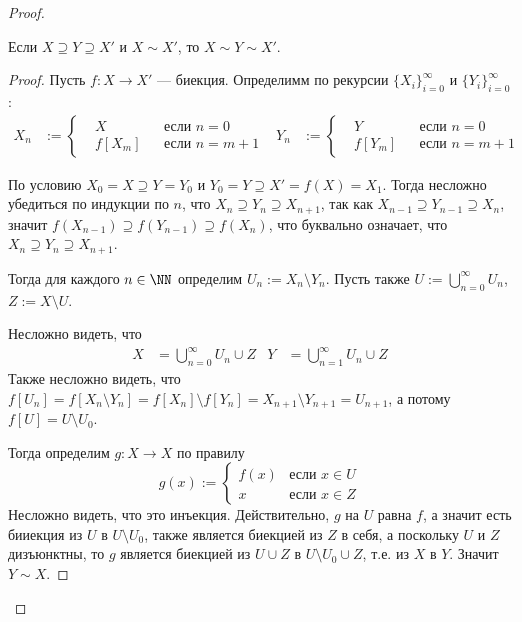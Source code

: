 \documentclass[12pt,a4paper]{article}
\begin{document}
    \begin{proof}
        \begin{thlemma}\label{CSB-th-lemma}
            Если $X \supseteq Y \supseteq X'$ и $X \sim X'$, то $X \sim Y \sim X'$.
        \end{thlemma}

        \begin{proof}
            Пусть $f: X \to X'$ --- биекция. Определимм по рекурсии $\{X_i\}_{i=0}^\infty$ и $\{Y_i\}_{i=0}^\infty$:
            \begin{align*}
                X_n &:= \left\{\begin{aligned}
                    &X && \text{если $n = 0$}\\
                    &f[X_m] && \text{если $n=m+1$}
                \end{aligned}\right.&
                Y_n &:= \left\{\begin{aligned}
                    &Y && \text{если $n = 0$}\\
                    &f[Y_m] && \text{если $n=m+1$}
                \end{aligned}\right.
            \end{align*}

            По условию $X_0 = X \supseteq Y = Y_0$ и $Y_0 = Y \supseteq X' = f(X) = X_1$. Тогда несложно убедиться по индукции по $n$, что $X_n \supseteq Y_n \supseteq X_{n+1}$, так как $X_{n-1} \supseteq Y_{n-1} \supseteq X_n$, значит $f(X_{n-1}) \supseteq f(Y_{n-1}) \supseteq f(X_n)$, что буквально означает, что $X_n \supseteq Y_n \supseteq X_{n+1}$.

            Тогда для каждого $n \in \NN$ определим $U_n := X_n \setminus Y_n$. Пусть также $U := \bigcup_{n=0}^\infty U_n$, $Z := X \setminus U$.

            Несложно видеть, что
            \begin{align*}
                X &= \bigcup_{n=0}^\infty U_n \cup Z&
                Y &= \bigcup_{n=1}^\infty U_n \cup Z
            \end{align*}
            Также несложно видеть, что $f[U_n] = f[X_n \setminus Y_n] = f[X_n] \setminus f[Y_n] = X_{n+1} \setminus Y_{n+1} = U_{n+1}$, а потому $f[U] = U\setminus U_0$.

            Тогда определим $g: X \to X$ по правилу
            \[g(x) := \begin{cases}
                f(x) & \text{если $x \in U$}\\
                x & \text{если $x \in Z$}
            \end{cases}\]
            Несложно видеть, что это инъекция. Действительно, $g$ на $U$ равна $f$, а значит есть бииекция из $U$ в $U\setminus U_0$, также является биекцией из $Z$ в себя, а поскольку $U$ и $Z$ дизъюнктны, то $g$ является биекцией из $U \cup Z$ в $U\setminus U_0 \cup Z$, т.е. из $X$ в $Y$. Значит $Y \sim X$.
        \end{proof}


\end{proof}
\end{document}
